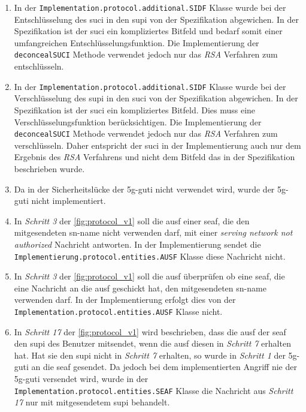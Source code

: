 \begin{enumerate}
\item In der \lstinline{Implementation.protocol.additional.SIDF} Klasse wurde bei der Entschlüsselung des \gls{suci} in den \gls{supi} von der Spezifikation abgewichen.
In der Spezifikation ist der \gls{suci} ein kompliziertes Bitfeld und bedarf somit einer umfangreichen Entschlüsselungsfunktion.
Die Implementierung der \lstinline{deconcealSUCI} Methode verwendet jedoch nur das \textit{RSA} Verfahren zum entschlüsseln.

\item In der \lstinline{Implementation.protocol.additional.SIDF} Klasse wurde bei der Verschlüsselung des \gls{supi} in den \gls{suci} von der Spezifikation abgewichen.
In der Spezifikation ist der \gls{suci} ein kompliziertes Bitfeld. Dies muss eine Verschlüsselungsfunktion berücksichtigen.
Die Implementierung der \lstinline{deconcealSUCI} Methode verwendet jedoch nur das \textit{RSA} Verfahren zum verschlüsseln.
Daher entspricht der \gls{suci} in der Implementierung auch nur dem Ergebnis des \textit{RSA} Verfahrens und nicht dem Bitfeld das in der Spezifikation beschrieben wurde.

\item Da in der Sicherheitslücke der \gls{5g-guti} nicht verwendet wird, wurde der \gls{5g-guti} nicht implementiert.

\item In \textit{Schritt 3} der \cref{fig:protocol_v1} soll die \gls{ausf} einer \gls{seaf}, die den mitgesendeten \gls{sn-name} nicht verwenden darf, mit einer \textit{serving network not authorized} Nachricht antworten.
In der Implementierung sendet die \lstinline{Implementierung.protocol.entities.AUSF} Klasse diese Nachricht nicht.

\item In \textit{Schritt 3} der \cref{fig:protocol_v1} soll die \gls{ausf} überprüfen ob eine \gls{seaf}, die eine Nachricht an die \gls{ausf} geschickt hat, den mitgesendeten \gls{sn-name} verwenden darf.
In der Implementierung erfolgt dies von der \lstinline{Implementation.protocol.entities.AUSF} Klasse nicht.

\item In \textit{Schritt 17} der \cref{fig:protocol_v1} wird beschrieben, dass die \gls{ausf} der \gls{seaf} den \gls{supi} des Benutzer mitsendet, wenn die \gls{ausf} diesen in \textit{Schritt 7} erhalten hat.
Hat sie den \gls{supi} nicht in \textit{Schritt 7} erhalten, so wurde in \textit{Schritt 1} der \gls{5g-guti} an die \gls{seaf} gesendet.
Da jedoch bei dem implementierten Angriff nie der \gls{5g-guti} versendet wird, wurde in der \lstinline{Implementation.protocol.entities.SEAF} Klasse die Nachricht aus \textit{Schritt 17} nur mit mitgesendetem \gls{supi} behandelt.


\end{enumerate}
